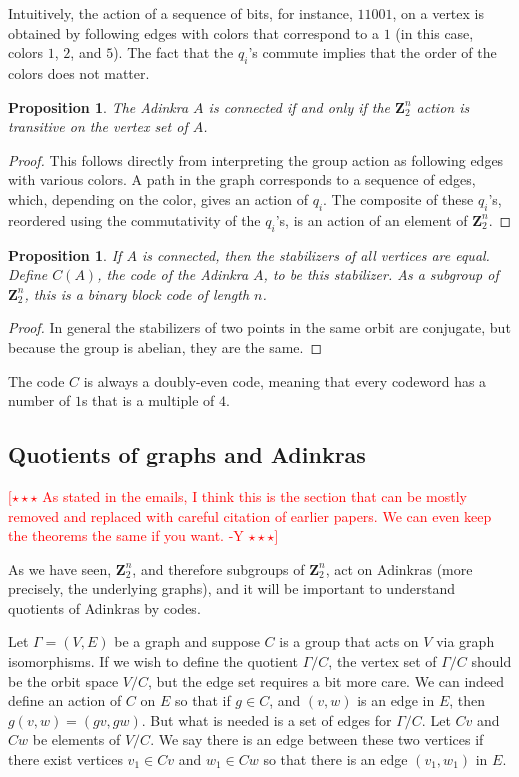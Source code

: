 \documentclass[12pt,twoside,singlespace]{article}
\numberwithin{equation}{section}
\newtheorem{prop}[equation]{Proposition}
\theoremstyle{definition}
\newcommand{\ZZ}{\mathbf{Z}}
\newcommand{\com}[1]{\textcolor{red}{$[\star \star \star$ #1 $\star \star \star]$}}
\begin{document}
Intuitively, the action of a sequence of bits, for instance, $11001$, on a vertex is obtained by following edges with colors that correspond to a $1$ (in this case, colors $1$, $2$, and $5$).  The fact that the $q_i$'s commute implies that the order of the colors does not matter.


\begin{prop}
\label{prop:transitive}
The Adinkra $A$ is connected if and only if the $\ZZ_2^n$ action is transitive on the vertex set of $A$.
\end{prop}
\begin{proof}
This follows directly from interpreting the group action as following edges with various colors.  A path in the graph corresponds to a sequence of edges, which, depending on the color, gives an action of $q_i$.  The composite of these $q_i$'s, reordered using the commutativity of the $q_i$'s, is an action of an element of $\ZZ_2^n$.

\end{proof}

\begin{prop}
If $A$ is connected, then the stabilizers of all vertices are equal.  Define $C(A)$, the \emph{code of the Adinkra} $A$, to be this stabilizer.  As a subgroup of $\ZZ_2^n$, this is a binary block code of length $n$.
\end{prop}
\begin{proof}
In general the stabilizers of two points in the same orbit are conjugate, but because the group is abelian, they are the same.
\end{proof}

The code $C$ is always a doubly-even code\cite{d2l:omni,d2l:decodes}, meaning that every codeword has a number of $1$s that is a multiple of $4$.

\subsection{Quotients of graphs and Adinkras}
\label{sec:quotient}

\com{As stated in the emails, I think this is the section that can be mostly removed and replaced with careful citation of earlier papers. We can even keep the theorems the same if you want. -Y}

As we have seen, $\ZZ_2^n$, and therefore subgroups of $\ZZ_2^n$, act on Adinkras (more precisely, the underlying graphs), and it will be important to understand quotients of Adinkras by codes.

Let $\Gamma=(V,E)$ be a graph and suppose $C$ is a group that acts on $V$ via graph isomorphisms.  If we wish to define the quotient $\Gamma/C$, the vertex set of $\Gamma/C$ should be the orbit space $V/C$, but the edge set requires a bit more care.  We can indeed define an action of $C$ on $E$ so that if $g\in C$, and $(v,w)$ is an edge in $E$, then $g(v,w)=(gv,gw)$.  But what is needed is a set of edges for $\Gamma/C$.  Let $Cv$ and $Cw$ be elements of $V/C$.  We say there is an edge between these two vertices if there exist vertices $v_1\in Cv$ and $w_1\in Cw$ so that there is an edge $(v_1,w_1)$ in $E$.
\end{document}
